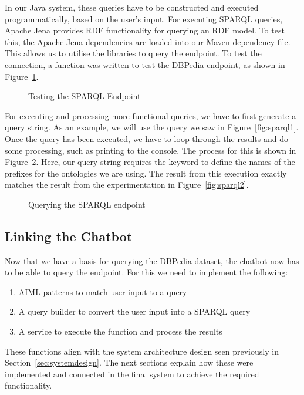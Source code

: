 In our Java system, these queries have to be constructed and executed programmatically, based on the user's input. For executing SPARQL queries, Apache Jena \cite{apachejena} provides RDF functionality for querying an RDF model. To test this, the Apache Jena dependencies are loaded into our Maven dependency file. This allows us to utilise the  libraries to query the endpoint. To test the connection, a function was written to test the DBPedia endpoint, as shown in Figure~\ref{fig:testrdf}.

\begin{figure}[h]
	\centering
	\qquad
	\caption{Testing the SPARQL Endpoint}
	\label{fig:testrdf}
\end{figure}

For executing and processing more functional queries, we have to first generate a query string. As an example, we will use the query we saw in Figure~\ref{fig:sparql1}. Once the query has been executed, we have to loop through the results and do some processing, such as printing to the console. The process for this is shown in Figure~\ref{fig:querysparql}. Here, our query string requires the  keyword to define the names of the prefixes for the ontologies we are using. The result from this execution exactly matches the result from the experimentation in Figure~\ref{fig:sparql2}.

\begin{figure}[h]
	\centering
	\qquad
	\caption{Querying the SPARQL endpoint}
	\label{fig:querysparql}
\end{figure}

\subsection{Linking the Chatbot}
Now that we have a basis for querying the DBPedia dataset, the chatbot now has to be able to query the endpoint. For this we need to implement the following:
\begin{enumerate}
	\item AIML patterns to match user input to a query
	\item A query builder to convert the user input into a SPARQL query
	\item A service to execute the function and process the results
\end{enumerate}
These functions align with the system architecture design seen previously in Section~\ref{sec:systemdesign}. The next sections explain how these were implemented and connected in the final system to achieve the required functionality.


